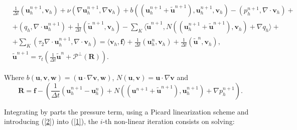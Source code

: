 \begin{align}
\label{1}
&\frac{1}{\Delta t}(\mathbf{u}_h^{n+1},\mathbf{v}_h)+\nu(\nabla\mathbf{u}_h^{n+1},\nabla\mathbf{v}_h)+b((\mathbf{u}_h^{n+1}+\tilde{\mathbf{u}}^{n+1}),\mathbf{u}_h^{n+1},\mathbf{v}_h)-(p_h^{n+1},\nabla\cdot\mathbf{v}_h)+\\\nonumber
&+(q_h,\nabla\cdot\mathbf{u}_h^{n+1})+\frac{1}{\Delta t}(\tilde{\mathbf{u}}^{n+1},\mathbf{v}_h)-\sum_K\langle\tilde{\mathbf{u}}^{n+1},N((\mathbf{u}_h^{n+1}+\tilde{\mathbf{u}}^{n+1}),\mathbf{v}_h)+\nabla q_h\rangle+\\\nonumber
&+\sum_K(\tau_2\nabla\cdot\mathbf{u}_h^{n+1},\nabla\cdot\mathbf{v}_h)=\langle\mathbf{v}_h,\mathbf{f}\rangle+\frac{1}{\Delta t}(\mathbf{u}_h^{n},\mathbf{v}_h)+\frac{1}{\Delta t}(\tilde{\mathbf{u}}^{n},\mathbf{v}_h),\\
\label{2}
&\tilde{\mathbf{u}}^{n+1}=\tau_t\left(\frac{1}{\Delta t}\tilde{\mathbf{u}}^{n}+\mathcal{P}^\perp(\mathbf{R})\right).
\end{align}

Where $b(\mathbf{u},\mathbf{v},\mathbf{w})=(\mathbf{u}\cdot\nabla\mathbf{v},\mathbf{w})$, $N(\mathbf{u},\mathbf{v})=\mathbf{u}\cdot\nabla\mathbf{v}$ and $$\mathbf{R}=\mathbf{f}-\left(\frac{1}{\Delta t}(\mathbf{u}_h^{n+1}-\mathbf{u}_h^{n})+N((\mathbf{u}^{n+1}+\tilde{\mathbf{u}}^{n+1}),\mathbf{u}_h^{n+1})+\nabla p_h^{n+1}\right).$$

Integrating by parts the pressure term, using a Picard linearization scheme and introducing (\ref{2}) into (\ref{1}), the $i$-th non-linear iteration consists on solving:

